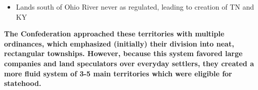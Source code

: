 \documentclass[a4paper]{article}
\begin{document}
{\begin{itemize}
                \begin{itemize}
                    \item Congress sold best land to companies rather than settlers
                    \item Resolved with "Northwest Ordinance" -> ten districts created in 1784 were abandoned, single Northwest Territory created out of lands north of Ohio River
                    \begin{itemize}
                        \item Equally divided into 3-5 territories, required 60,000 people for statehood, freedom of religion, no slavery, right to trial by jury
                    \end{itemize}
                \end{itemize}
                \item Lands south of Ohio River never as regulated, leading to creation of TN and KY 
            \end{itemize}
            \textbf{The Confederation approached these territories with multiple ordinances, which emphasized (initially) their division into neat, rectangular townships. However, because this system favored large companies and land speculators over everyday settlers, they created a more fluid system of 3-5 main territories which were eligible for statehood.}
        }
\end{document}

